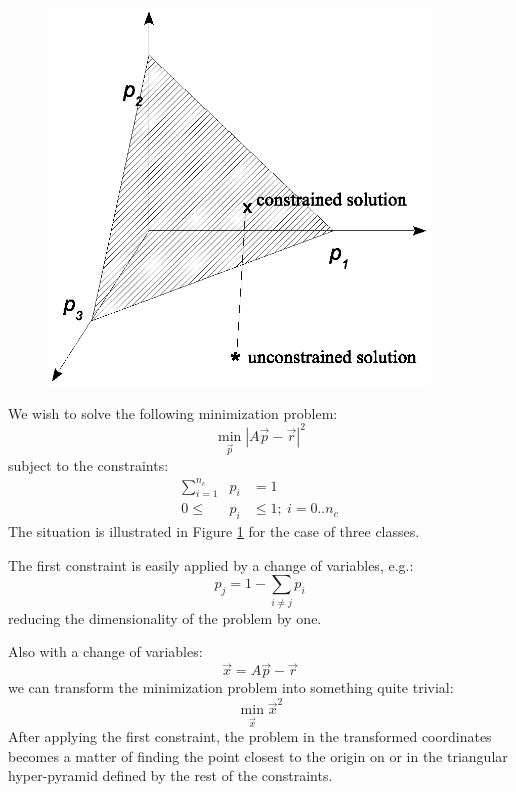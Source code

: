 \documentclass{article}
\begin{document}
\begin{figure}
\includegraphics[width=0.9\textwidth]{config1}
\label{fig1}
\end{figure}

We wish to solve the following minimization problem:
\begin{equation}
\underset{\vec p}{\min} |A \vec p - \vec r|^2
\label{basic_min}
\end{equation}
subject to the constraints:
\begin{eqnarray}
	\sum_{i=1}^{n_c} & p_i & = 1 \label{norm_constraint}\\
	0 \le & p_i & \le 1; ~i=0..n_c \label{prob_constraint}
\end{eqnarray}
The situation is illustrated in Figure \ref{fig1} for the case of three classes.

The first constraint is easily applied by a change of variables, e.g.:
\begin{equation}
p_j=1-\sum_{i \ne j} p_i
\end{equation}
reducing the dimensionality of the problem by one. 

Also with a change of variables: 
\begin{equation}
\vec x = A \vec p - \vec r
\end{equation}
we can transform the minimization problem into
something quite trivial:
\begin{equation}
\underset{\vec x}{\min} {\vec x}^2
\label{trivial_min}
\end{equation}
After applying the first constraint, the problem in the transformed coordinates
becomes a matter of finding the point closest to the origin on or in the 
triangular hyper-pyramid defined by the rest of the constraints.
\end{document}
